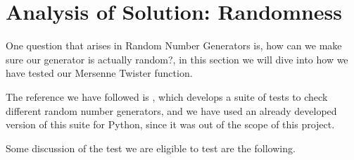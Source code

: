 \section{Analysis of Solution: Randomness}
One question that arises in Random Number Generators is, how can we make sure our generator is actually random?, in this section we will dive into how we have tested our Mersenne Twister function.

The reference we have followed is \cite{smid2010statistical}, which develops a suite of tests to check different random number generators, and we have used an already developed version of this suite for Python\cite{InsaneMonster2022}, since it was out of the scope of this project. 

Some discussion of the test we are eligible to test are the following.


